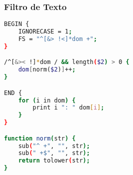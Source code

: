 \documentclass{article}
\begin{document}
\subsubsection{Filtro de Texto}

\begin{lstlisting}[language=bash]
BEGIN {
	IGNORECASE = 1;
	FS = "^[&> !<]*dom +";
}

/^[&>< !]*dom / && length($2) > 0 {
	dom[norm($2)]++;
}

END {
	for (i in dom) {
		print i ": " dom[i];
	}
}

function norm(str) {
	sub("^ +", "", str);
	sub(" +$", "", str);
	return tolower(str);
}

\end{lstlisting}
\end{document}
